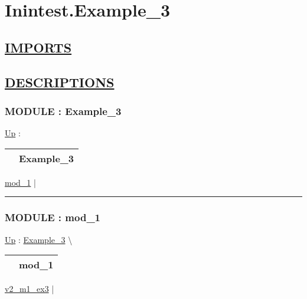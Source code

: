\chapter*{Inintest.Example\_3}
\hypertarget{ecldoc:toc:Inintest.Example_3}{}

\section*{\underline{IMPORTS}}

\section*{\underline{DESCRIPTIONS}}
\subsection*{MODULE : Example\_3}
\hypertarget{ecldoc:Inintest.Example_3}{}
\hyperlink{ecldoc:toc:Inintest}{Up} :

{\renewcommand{\arraystretch}{1.5}
\begin{tabularx}{\textwidth}{|>{\raggedright\arraybackslash}l|X|}
\hline
\hspace{0pt} & Example\_3 \\
\hline
\end{tabularx}
}

\par


\hyperlink{ecldoc:Inintest.Example_3.mod_1}{mod\_1}  |

\rule{\linewidth}{0.5pt}

\subsection*{MODULE : mod\_1}
\hypertarget{ecldoc:Inintest.Example_3.mod_1}{}
\hyperlink{ecldoc:Inintest.Example_3}{Up} :
\hspace{0pt} \hyperlink{ecldoc:Inintest.Example_3}{Example_3} \textbackslash 

{\renewcommand{\arraystretch}{1.5}
\begin{tabularx}{\textwidth}{|>{\raggedright\arraybackslash}l|X|}
\hline
\hspace{0pt} & mod\_1 \\
\hline
\end{tabularx}
}

\par


\hyperlink{ecldoc:inintest.example_3.mod_1.v2_m1_ex3}{v2\_m1\_ex3}  |

